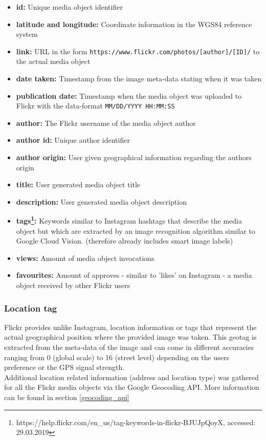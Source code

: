 \begin{itemize}[label={}]
    \item \textbf{id:} Unique media object identifier 
    \item \textbf{latitude and longitude:} Coordinate information in the WGS84 reference system 
    \item \textbf{link:} URL in the form \texttt{https://www.flickr.com/photos/[author]/[ID]/} to the actual media object 
    \item \textbf{date taken:} Timestamp from the image meta-data stating when it was taken 
    \item \textbf{publication date:} Timestamp when the media object was uploaded to Flickr with the data-format \texttt{MM/DD/YYYY HH:MM:SS} 
    \item \textbf{author:} The Flickr username of the media object author 
    \item \textbf{author id:} Unique author identifier  
    \item \textbf{author origin:} User given geographical information regarding the authors origin 
    \item \textbf{title:} User generated media object title 
    \item \textbf{description:} User generated media object description 
    \item \textbf{tags\footnote{https://help.flickr.com/en\_us/tag-keywords-in-flickr-BJUJpQoyX, accessed: 29.03.2019}:} Keywords similar to Instagram hashtags that describe the media object but which are extracted by an image recognition algorithm similar to Google Cloud Vision. (therefore already includes smart image labels) 
    \item \textbf{views:} Amount of media object invocations 
    \item \textbf{favourites:} Amount of approves - similar to 'likes' on Instagram - a media object received by other Flickr users 
\end{itemize}

\subsubsection{Location tag} \label{flickr_location_tag}
Flickr provides unlike Instagram, location information or tags that represent the actual geographical position where the provided image was taken. This geotag is extracted from the meta-data of the image and can come in different accuracies ranging from 0 (global scale) to 16 (street level) depending on the users preference or the GPS signal strength. \\
Additional location related information (address and location type) was gathered for all the Flickr media objects via the Google Geocoding API. More information can be found in section \ref{geocoding_api}

